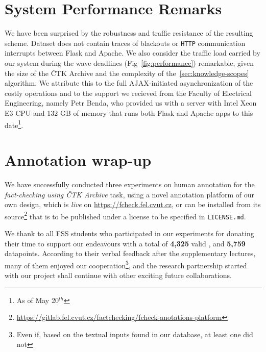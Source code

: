 \section{System Performance Remarks}
We have been surprised by the robustness and traffic resistance of the resulting scheme. Dataset does not contain traces of blackouts or \texttt{HTTP} communication interrupts between \textsf{Flask} and \textsf{Apache}. We also consider the traffic load carried by our system during the wave deadlines (Fig~\ref{fig:performance}) remarkable, given the size of the \textsf{ČTK Archive} and the complexity of the~\ref{sec:knowledge-scopes} algorithm. We attribute this to the full \textsf{AJAX}-initiated asynchronization of the costly operations and to the support we recieved from the \textsf{Faculty of Electrical Engineering}, namely Petr Benda, who provided us with a server with \textsf{Intel Xeon E3 CPU} and 132 GB of memory that runs both \textsf{Flask} and \textsf{Apache} apps to this date\footnote{As of May 20$^{th}$}.

\section{Annotation wrap-up}
We have successfully conducted three experiments on human annotation for the \textit{fact-checking using \textsf{ČTK Archive}} task, using a novel annotation platform of our own design, which is \textit{live} on \url{https://fcheck.fel.cvut.cz}, or can be installed from its source\footnote{\url{https://gitlab.fel.cvut.cz/factchecking/fcheck-anotations-platform}} that is to be published under a license to be specified in \texttt{LICENSE.md}.

We thank to all \textsf{FSS} students who participated in our experiments for donating their time to support our endeavours with a total of \textbf{4,325} valid , and \textbf{5,759}  datapoints.
According to their verbal feedback after the supplementary lectures, many of them enjoyed our cooperation\footnote{Even if, based on the textual inputs found in our database, at least one did not}, and the research partnership started with our project shall continue with other exciting future collaborations. 
